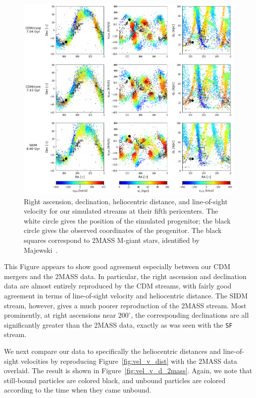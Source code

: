 \begin{figure}
    \centering
    \includegraphics[width=1.0\linewidth]{figs/equatorial_2mass.png}
    \caption{%
        Right ascension, declination, heliocentric distance, and line-of-sight
        velocity for our simulated streams at their fifth pericenters. The white
        circle gives the position of the simulated progenitor; the black circle
        gives the observed coordinates of the progenitor.  The black squares
        correspond to 2MASS M-giant stars, identified by
        Majewski~\cite{majewski_two_2003}.
    }
    \label{fig:eq_2mass}
\end{figure}

This Figure appears to show good agreement especially between our CDM mergers
and the 2MASS data. In particular, the right ascension and declination data are
almost entirely reproduced by the CDM streams, with fairly good agreement in
terms of line-of-sight velocity and heliocentric distance. The SIDM stream,
however, gives a much poorer reproduction of the 2MASS stream. Most prominently,
at right ascensions near $200^\circ$, the corresponding declinations are all
significantly greater than the 2MASS data, exactly as was seen with the
\verb|SF| stream.

We next compare our data to specifically the heliocentric distances and
line-of-sight velocities by reproducing Figure~\ref{fig:vel_v_dist} with the
2MASS data overlaid. The result is shown in Figure~\ref{fig:vel_v_d_2mass}.
Again, we note that still-bound particles are colored black, and unbound
particles are colored according to the time when they came unbound.

